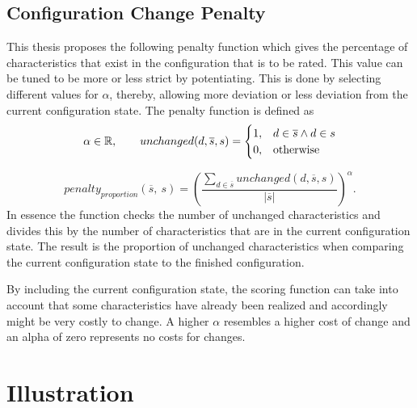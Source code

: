\subsection{Configuration Change Penalty}
\label{subsec:Concept:ReccomendationGeneration:Penalty}

This thesis proposes the following penalty function which gives the percentage of characteristics that exist in the configuration that is to be rated. This value can be tuned to be more or less strict by potentiating. This is done by selecting different values for $\alpha$, thereby, allowing more deviation or less deviation from the current configuration state. The penalty function is defined as
\begin{equation}
    \notag \alpha \in \mathbb{R}, \qquad     unchanged(d,\overline{s}, s) = 
    \begin{cases}
      1, & d \in \overline{s} \land d \in s \\
      0, & \text{otherwise}
    \end{cases}
\end{equation}

\begin{equation}
    penalty_{proportion}(\overline{s},\ s) =  \left(\frac{\sum_{d \in \overline{s}} unchanged(d,\overline{s}, s)}{|\overline{s}|}\right)^\alpha.
\end{equation}
In essence the function checks the number of unchanged characteristics and divides this by the number of characteristics that are in the current configuration state. The result is the proportion of unchanged characteristics when comparing the current configuration state to the finished configuration.

By including the current configuration state, the scoring function can take into account that some characteristics have already been realized and accordingly might be very costly to change. A higher $\alpha$ resembles a higher cost of change and an alpha of zero represents no costs for changes.

\section{Illustration}
\label{sec:Concept:Illustration}

